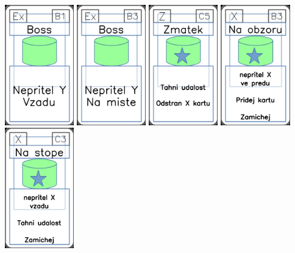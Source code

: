 \documentclass[a4paper]{article}
\begin{document}
	\includegraphics[width=3.0cm]{img-4_5}
	\includegraphics[width=3.0cm]{img-4_7}
	\includegraphics[width=3.0cm]{img-5_44}
	\includegraphics[width=3.0cm]{img-5_7}
	\includegraphics[width=3.0cm]{img-5_12}
\end{document}
